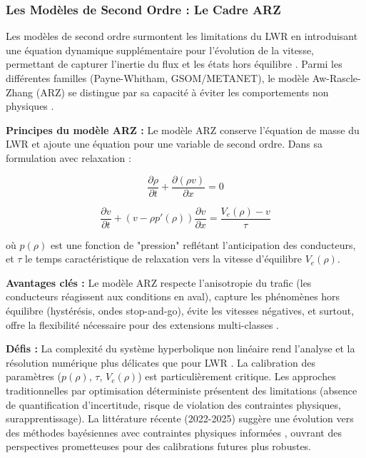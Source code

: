 \subsubsection{Les Modèles de Second Ordre : Le Cadre ARZ}
Les modèles de second ordre surmontent les limitations du LWR en introduisant une équation dynamique supplémentaire pour l'évolution de la vitesse, permettant de capturer l'inertie du flux et les états hors équilibre \cite{FanHertySeibold2014}. Parmi les différentes familles (Payne-Whitham, GSOM/METANET), le modèle Aw-Rascle-Zhang (ARZ) se distingue par sa capacité à éviter les comportements non physiques \cite{AwKlarMaterneRascle2000, Zhang2002}.

\textbf{Principes du modèle ARZ :} Le modèle ARZ conserve l'équation de masse du LWR et ajoute une équation pour une variable de second ordre. Dans sa formulation avec relaxation \cite{yu2024traffic} :

\begin{equation}
    \frac{\partial \rho}{\partial t} + \frac{\partial (\rho v)}{\partial x} = 0
\end{equation}

\begin{equation}
    \frac{\partial v}{\partial t} + (v - \rho p'(\rho)) \frac{\partial v}{\partial x} = \frac{V_e(\rho) - v}{\tau}
\end{equation}

où $p(\rho)$ est une fonction de "pression" reflétant l'anticipation des conducteurs, et $\tau$ le temps caractéristique de relaxation vers la vitesse d'équilibre $V_e(\rho)$.

\textbf{Avantages clés :} Le modèle ARZ respecte l'anisotropie du trafic (les conducteurs réagissent aux conditions en aval), capture les phénomènes hors équilibre (hystérésis, ondes stop-and-go), évite les vitesses négatives, et surtout, offre la flexibilité nécessaire pour des extensions multi-classes \cite{LingChanutLebacque2011Multiclass, FanHertySeibold2014}.

\textbf{Défis :} La complexité du système hyperbolique non linéaire rend l'analyse et la résolution numérique plus délicates que pour LWR \cite{DiEtAl2024}. La calibration des paramètres ($p(\rho)$, $\tau$, $V_e(\rho)$) est particulièrement critique. Les approches traditionnelles par optimisation déterministe présentent des limitations (absence de quantification d'incertitude, risque de violation des contraintes physiques, surapprentissage). La littérature récente (2022-2025) suggère une évolution vers des méthodes bayésiennes avec contraintes physiques informées \cite{KhelifiEtAl2023}, ouvrant des perspectives prometteuses pour des calibrations futures plus robustes.

